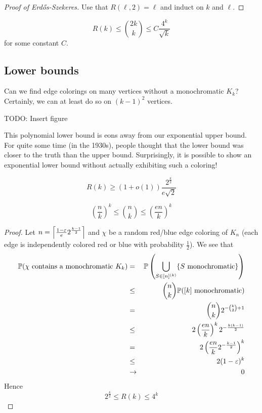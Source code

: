 \documentclass{article}
\begin{document}
\begin{proof}[Proof of Erd\H os-Szekeres]
  Use that $R(\ell, 2) = \ell$ and induct on $k$ and $\ell$.
\end{proof}

\begin{cor}
  $$R(k) \le \binom{2k} k \le C\frac{4^k}{\sqrt k}$$
  for some constant $C$.
\end{cor}

\subsection{Lower bounds}

Can we find edge colorings on many vertices without a monochromatic $K_k$?
Certainly, we can at least do so on $(k - 1)^2$ vertices.

TODO: Insert figure

This polynomial lower bound is eons away from our exponential upper bound. For quite some time (in the 1930s), people thought that the lower bound was closer to the truth than the upper bound. Surprisingly, it is possible to show an exponential lower bound without actually exhibiting such a coloring!

\begin{thm}[Erd\H os, 1948]
  $$R(k) \ge (1 + o(1))\frac{2^{\frac k 2}}{e\sqrt 2}$$
\end{thm}
\begin{fact}
  $$\left(\frac n k\right)^k \le \binom n k \le \left(\frac{en}k\right)^k$$
\end{fact}
\begin{proof}
  Let $n = \left\lceil \frac{1 - \varepsilon}e 2^{\frac{k - 1} 2}\right\rceil$ and $\chi$ be a random red/blue edge coloring of $K_n$ (each edge is independently colored red or blue with probability $\frac 1 2$). We see that
  \begin{eqnarray*}
    \mathbb P(\chi \text{ contains a monochromatic } K_k)
    & = & \mathbb P\left(\bigcup_{S \in [n]^{(k)}} \{S \text{ monochromatic}\}\right) \\
    & \le & \binom n k \mathbb P([k] \text{ monochromatic}) \\
    & = & \binom n k 2^{-\binom k 2 + 1} \\
    & \le & 2 \left(\frac{en}k\right)^k 2^{-\frac{k(k - 1)}2} \\
    & = & 2 \left(\frac{en}k 2^{-\frac{k - 1}2}\right)^k \\
    & \le & 2(1 - \varepsilon)^k \\
    & \rightarrow & 0
  \end{eqnarray*}
  Hence
  $$2^{\frac k 2} \le R(k) \le 4^k$$
\end{proof}
\end{document}
